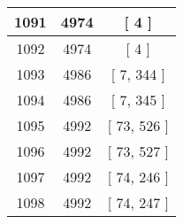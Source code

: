 \begin{center}
\begin{longtable}[H]{|| c c c ||}
\hline
1091 & 4974 & [ 4 ] \\ 
\hline
1092 & 4974 & [ 4 ] \\ 
\hline
1093 & 4986 & [ 7, 344 ] \\ 
\hline
1094 & 4986 & [ 7, 345 ] \\ 
\hline
1095 & 4992 & [ 73, 526 ] \\ 
\hline
1096 & 4992 & [ 73, 527 ] \\ 
\hline
1097 & 4992 & [ 74, 246 ] \\ 
\hline
1098 & 4992 & [ 74, 247 ] \\ 
\hline
\end{longtable}
\end{center}
